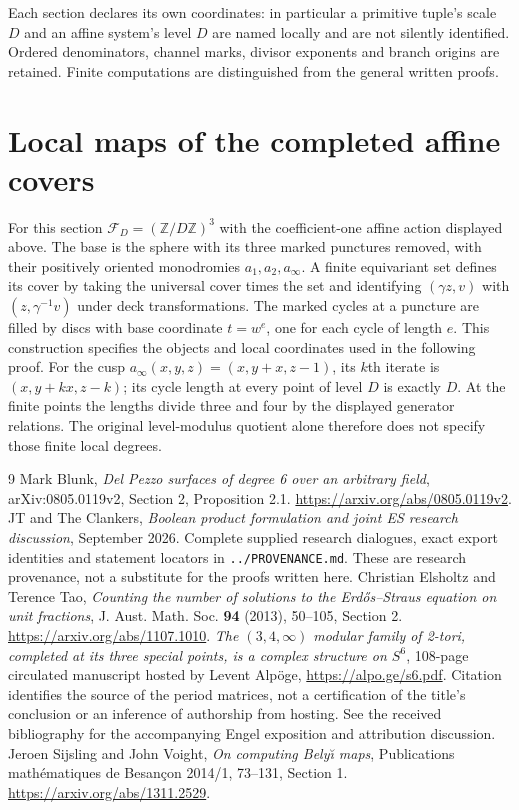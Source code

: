 \documentclass[11pt,a4paper]{article}
\theoremstyle{definition}
\begin{document}
Each section declares its own coordinates: in particular a primitive
tuple's scale $D$ and an affine system's level $D$ are named locally and
are not silently identified. Ordered denominators, channel marks,
divisor exponents and branch origins are retained. Finite computations
are distinguished from the general written proofs.





\section{Local maps of the completed affine covers}
For this section $\mathcal F_D=(\mathbb Z/D\mathbb Z)^3$ with the
coefficient-one affine action displayed above. The base is the sphere
with its three marked punctures removed, with their positively oriented
monodromies $a_1,a_2,a_\infty$. A finite equivariant set defines its
cover by taking the universal cover times the set and identifying
$(\gamma z,v)$ with $(z,\gamma^{-1}v)$ under deck transformations.
The marked cycles at a puncture are filled by discs with base coordinate
$t=w^e$, one for each cycle of length $e$. This construction specifies
the objects and local coordinates used in the following proof.
For the cusp $a_\infty(x,y,z)=(x,y+x,z-1)$, its $k$th iterate is
$(x,y+kx,z-k)$; its cycle length at every point of level $D$ is exactly
$D$. At the finite points the lengths divide three and four by the
displayed generator relations. The original level-modulus quotient
alone therefore does not specify those finite local degrees.



\begin{thebibliography}{9}
 Mark Blunk, \emph{Del Pezzo surfaces of degree 6 over an
arbitrary field}, arXiv:0805.0119v2, Section 2, Proposition 2.1.
\url{https://arxiv.org/abs/0805.0119v2}.
 JT and The Clankers, \emph{Boolean product formulation and
joint ES research discussion}, September 2026. Complete supplied research
dialogues, exact export identities and statement locators in
\texttt{../PROVENANCE.md}. These are research provenance, not a substitute
for the proofs written here.
 Christian Elsholtz and Terence Tao, \emph{Counting the number
of solutions to the Erd\H{o}s--Straus equation on unit fractions},
J. Aust. Math. Soc. \textbf{94} (2013), 50--105, Section 2.
\url{https://arxiv.org/abs/1107.1010}.
 \emph{The $(3,4,\infty)$ modular family of 2-tori,
completed at its three special points, is a complex structure on $S^6$},
108-page circulated manuscript hosted by Levent Alp\"oge,
\url{https://alpo.ge/s6.pdf}. Citation identifies the source of the period
matrices, not a certification of the title's conclusion or an inference
of authorship from hosting. See the received bibliography for the
accompanying Engel exposition and attribution discussion.
 Jeroen Sijsling and John Voight, \emph{On computing Bely\u\i
maps}, Publications math\'ematiques de Besan\c con 2014/1, 73--131,
Section 1. \url{https://arxiv.org/abs/1311.2529}.
\end{thebibliography}
\end{document}
